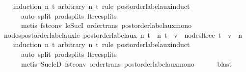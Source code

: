 \begin{isabellebody}
%
\isadelimproof
\ \ %
\endisadelimproof
%
\isatagproof
{}\isamarkupfalse%
\ {\isacharparenleft}{\kern0pt}induction\ n\ t\ arbitrary{\isacharcolon}{\kern0pt}\ n{\isacharprime}{\kern0pt}\ t{\isacharprime}{\kern0pt}\ rule{\isacharcolon}{\kern0pt}\ postorder{\isacharunderscore}{\kern0pt}label{\isacharunderscore}{\kern0pt}aux{\isachardot}{\kern0pt}induct{\isacharcomma}{\kern0pt}\isanewline
\ \ \ \ \ \ auto\ split{\isacharcolon}{\kern0pt}\ prod{\isachardot}{\kern0pt}splits\ ltree{\isachardot}{\kern0pt}splits{\isacharcomma}{\kern0pt}\isanewline
\ \ \ \ \ \ {\isacharparenleft}{\kern0pt}metis\ fst{\isacharunderscore}{\kern0pt}conv\ le{\isacharunderscore}{\kern0pt}SucI\ order{\isachardot}{\kern0pt}trans\ postorder{\isacharunderscore}{\kern0pt}label{\isacharunderscore}{\kern0pt}aux{\isacharunderscore}{\kern0pt}mono{\isacharparenright}{\kern0pt}{\isacharplus}{\kern0pt}{\isacharparenright}{\kern0pt}%
\endisatagproof
{\isafoldproof}%
%
\isadelimproof
\isanewline
%
\endisadelimproof
\isanewline
{}\isamarkupfalse%
\ nodes{\isacharunderscore}{\kern0pt}postorder{\isacharunderscore}{\kern0pt}label{\isacharunderscore}{\kern0pt}aux{\isacharunderscore}{\kern0pt}le{\isacharcolon}{\kern0pt}\ {\isachardoublequoteopen}postorder{\isacharunderscore}{\kern0pt}label{\isacharunderscore}{\kern0pt}aux\ n\ t\ {\isacharequal}{\kern0pt}\ {\isacharparenleft}{\kern0pt}n{\isacharprime}{\kern0pt}{\isacharcomma}{\kern0pt}\ t{\isacharprime}{\kern0pt}{\isacharparenright}{\kern0pt}\ {\isasymLongrightarrow}\ v\ {\isasymin}\ nodes{\isacharunderscore}{\kern0pt}ltree\ t{\isacharprime}{\kern0pt}\ {\isasymLongrightarrow}\ v\ {\isasymle}\ n{\isacharprime}{\kern0pt}{\isachardoublequoteclose}\isanewline
%
\isadelimproof
\ \ %
\endisadelimproof
%
\isatagproof
{}\isamarkupfalse%
\ {\isacharparenleft}{\kern0pt}induction\ n\ t\ arbitrary{\isacharcolon}{\kern0pt}\ n{\isacharprime}{\kern0pt}\ t{\isacharprime}{\kern0pt}\ rule{\isacharcolon}{\kern0pt}\ postorder{\isacharunderscore}{\kern0pt}label{\isacharunderscore}{\kern0pt}aux{\isachardot}{\kern0pt}induct{\isacharcomma}{\kern0pt}\isanewline
\ \ \ \ \ \ auto\ split{\isacharcolon}{\kern0pt}\ prod{\isachardot}{\kern0pt}splits\ ltree{\isachardot}{\kern0pt}splits{\isacharcomma}{\kern0pt}\isanewline
\ \ \ \ \ \ metis\ Suc{\isacharunderscore}{\kern0pt}leD\ fst{\isacharunderscore}{\kern0pt}conv\ order{\isacharunderscore}{\kern0pt}trans\ postorder{\isacharunderscore}{\kern0pt}label{\isacharunderscore}{\kern0pt}aux{\isacharunderscore}{\kern0pt}mono{\isacharcomma}{\kern0pt}\isanewline
\ \ \ \ \ \ blast{\isacharparenright}{\kern0pt}%

\end{isabellebody}
